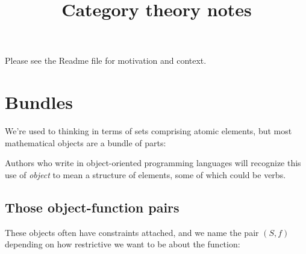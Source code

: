 \documentclass[11pt]{article}
\begin{document}


\title{Category theory notes}
\maketitle

Please see the Readme file for motivation and context.

\section{Bundles}\label{bundlesec}
We're used to thinking in terms of sets comprising atomic elements, but
most mathematical objects are a bundle of parts:


Authors who write in object-oriented programming languages will recognize this
use of {\em object} to mean a structure of elements, some of which could be verbs.

\subsection{Those object-function pairs}
These objects often have constraints attached, and we name the pair $(S, f)$ depending on
how restrictive we want to be about the function:

\end{document}
